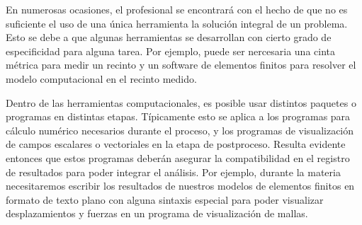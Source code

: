 \newcommand{\userbar}[2]{
\begin{tikzpicture}
  \fill [gray] (0,0) rectangle (1,1.5); 
  \node (#2) [fit={(0,0) (3,1)},text width=\textwidth,align=left] at (1.5,0.5) {\textbf{#1}};
\end{tikzpicture}
}

\newcommand{\pcbar}[4]{
\begin{tikzpicture}
  \fill [Cerulean] (#1,0) rectangle (#2,1.5); 
  \node (#4) [fit={(0,0) (3,1)},text width=\textwidth,align=left] at (1.5,0.5) {\textbf{#3}};
\end{tikzpicture}
}


En numerosas ocasiones, el profesional se encontrará con el 
hecho de que no es suficiente el uso de una única herramienta 
la solución integral de un problema. Esto se debe a que 
algunas herramientas se desarrollan con cierto grado de 
especificidad para alguna tarea. Por ejemplo, puede 
ser nercesaria una cinta métrica para medir un recinto 
y un software de elementos finitos para resolver 
el modelo computacional en el recinto medido. 

Dentro de las herramientas computacionales, es posible
usar distintos paquetes o programas en distintas etapas.
Típicamente esto se aplica a los programas para cálculo
numérico necesarios durante el proceso, y los programas
de visualización de campos escalares o vectoriales en
la etapa de postproceso. Resulta evidente entonces
que estos programas deberán asegurar la compatibilidad
en el registro de resultados para poder integrar 
el análisis. Por ejemplo, durante la materia necesitaremos
escribir los resultados de nuestros modelos de elementos
finitos en formato de texto plano con alguna sintaxis
especial para poder visualizar desplazamientos y 
fuerzas en un programa de visualización de 
mallas. 

\mode*

